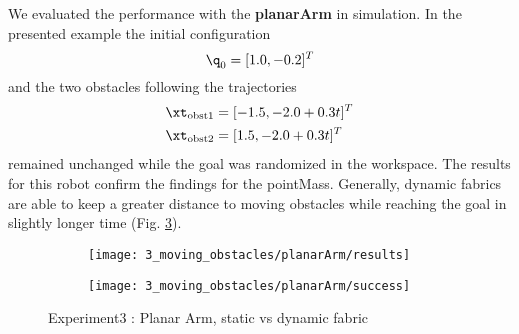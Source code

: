 We evaluated the performance with the \textbf{planarArm} in simulation. In the presented
example the initial configuration \[\q_0 = [1.0, -0.2]^T\] and the two obstacles following
the trajectories
\begin{align*}
  \xt_{\textrm{obst1}} &= [-1.5, -2.0 + 0.3t]^T \\
  \xt_{\textrm{obst2}} &= [1.5, -2.0 + 0.3t]^T \\
\end{align*}
remained unchanged while the goal was randomized in the workspace. The results for this
robot confirm the findings for the pointMass. Generally, dynamic fabrics are able to keep
a greater distance to moving obstacles while reaching the goal in slightly longer time
(Fig. \ref{fig:experiment3_planarArm}).

\begin{figure}[h]
  \centering
  \begin{subfigure}{0.7\linewidth}
    \centering
    \texttt{[image: 3\_moving\_obstacles/planarArm/results]}
    \caption{}
    \label{subfig:experiment3_planarArm_static_dynamic_res}
  \end{subfigure}%
  \begin{subfigure}{0.3\linewidth}
    \centering
    \texttt{[image: 3\_moving\_obstacles/planarArm/success]}
    \caption{}
    \label{subfig:experiment3_planarArm_static_dynamic_success}
  \end{subfigure}
  \caption{Experiment3 : Planar Arm, static vs dynamic fabric}%
  \label{fig:experiment3_planarArm}
\end{figure}
